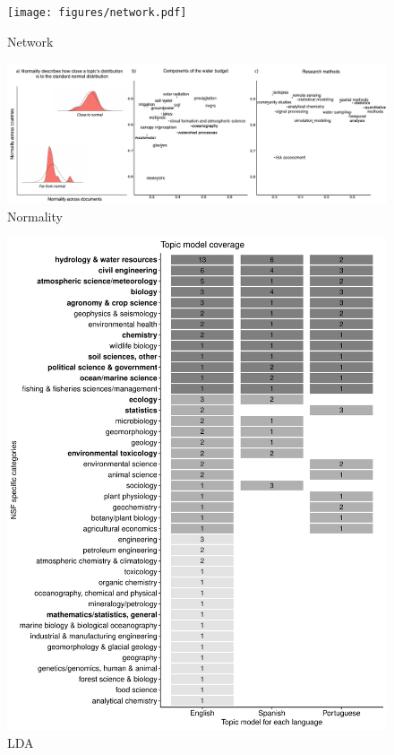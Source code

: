 \begin{figure}
\centering
\texttt{[image: figures/network.pdf]}
\caption{Network}
\label{fig:network}
\end{figure}



\begin{figure}
\centering
\includegraphics[scale=0.5]{figures/normality.pdf}
\caption{Normality}
\label{fig:normality}
\end{figure}




\begin{figure}
\centering
\includegraphics[scale=0.6]{figures/lda.pdf}
\caption{LDA}
\label{fig:lda}
\end{figure}